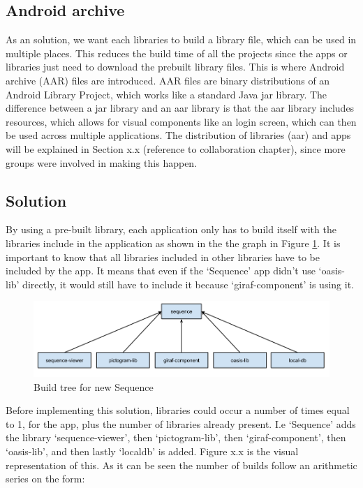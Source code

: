 \subsection{Android archive}
As an solution, we want each libraries to build a library file, which can be used in multiple places. This reduces the build time of all the projects since the apps or libraries just need to download the prebuilt library files.
This is where Android archive (AAR) files are introduced. AAR files are binary distributions of an Android Library Project, which works like a standard Java jar library. The difference between a jar library and an aar library is that the aar library includes resources, which allows for visual components like an login screen, which can then be used across multiple applications. 
The distribution of libraries (aar) and apps will be explained in Section x.x (reference to collaboration chapter), since more groups were involved in making this happen.

\subsection{Solution}
By using a pre-built library, each application only has to build itself with the libraries include in the application as shown in the the graph in Figure \ref{newbuild}. It is important to know that all libraries included in other libraries have to be included by the app. It means that even if the ‘Sequence’ app didn't use ‘oasis-lib’ directly, it would still have to include it because ‘giraf-component’ is using it.

\begin{figure}[H]
	\centering
	\includegraphics[width=0.8 \textwidth]{pictures/newbuild.png}
	\caption{Build tree for new Sequence}
	\label{newbuild}
\end{figure}

Before implementing this solution, libraries could occur a number of times equal to 1, for the app, plus the number of libraries already present. I.e ‘Sequence’ adds the library ‘sequence-viewer’, then ‘pictogram-lib’, then ‘giraf-component’, then ‘oasis-lib’, and then lastly ‘localdb’ is added.  Figure x.x is the visual representation of this. As it can be seen the number of builds follow an arithmetic series on the form:


